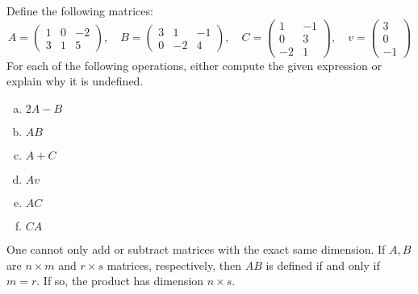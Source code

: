 \documentclass[11pt,letterpaper]{article}
\begin{document}
 Define the following matrices:
	\[
	A= \begin{pmatrix} 1 & 0 & -2 \\ 3 & 1 & 5 \end{pmatrix}, \quad
	B= \begin{pmatrix} 3 & 1 & -1 \\	0 & -2 & 4 \end{pmatrix}, \quad
	C= \begin{pmatrix} 1 & -1 \\ 0 & 3 \\ -2 & 1 \end{pmatrix}, \quad
	v= \begin{pmatrix} 3 \\ 0 \\-1\end{pmatrix}
	\]
For each of the following operations, either compute the given expression or explain why it is undefined. 

\begin{enumerate}[(a)]
\item $2A - B$
\item $AB$
\item $A + C$
\item $Av$
\item $AC$
\item $CA$
\end{enumerate} 

\sol One cannot only add or subtract matrices with the exact same dimension. If $A, B$ are $n \times m$ and $r \times s$ matrices, respectively, then $AB$ is defined if and only if $m= r$. If so, the product has dimension $n \times s$. 
\end{document}

